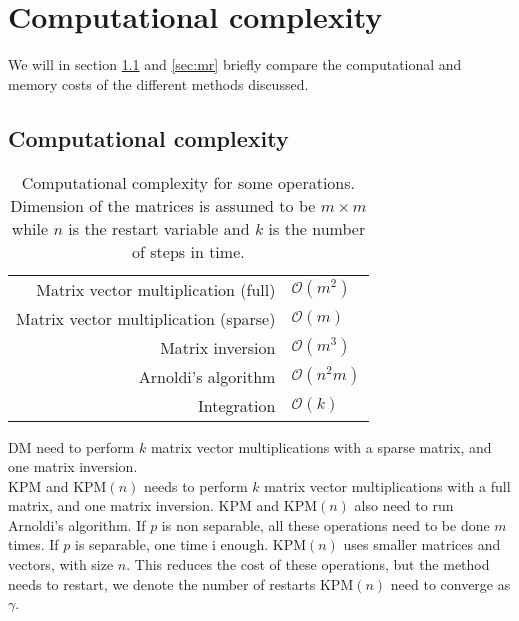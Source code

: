 \chapter{Computational complexity}%
\label{sec:comp}
We will in section \ref{sec:cc} and \ref{sec:mr} briefly compare the computational and memory costs of the different methods discussed.%
\section{Computational complexity} \label{sec:cc}
\begin{table}[H]
\centering
\begin{tabular}{r | l}
 Matrix vector multiplication (full) & $\mathcal{O}(m^2)$ \cite{complex} \\
 Matrix vector multiplication (sparse) & $\mathcal{O}(m)$ \cite{complex} \\
 Matrix inversion  & $ \mathcal{O}(m^3)$ \cite{complex} \\
 Arnoldi's algorithm & $ \mathcal{O}(n^2 m)$ \cite{saad} \\
 Integration & $\mathcal{O}(k)$
\end{tabular}
\caption{Computational complexity for some operations. Dimension of the matrices is assumed to be $m \times m$ while $n$ is the restart variable and $k$ is the number of steps in time.}
\label{tab:runtime}
\end{table}
DM need to perform $k$ matrix vector multiplications with a sparse matrix, and one matrix inversion. \\

KPM and KPM$(n)$ needs to perform $k$ matrix vector multiplications with a full matrix, and one matrix inversion. KPM and KPM$(n)$ also need to run Arnoldi's algorithm. If $p$ is non separable, all these operations need to be done $m$ times. If $p$ is separable, one time i enough. KPM$(n)$ uses smaller matrices and vectors, with size $n$. This reduces the cost of these operations, but the method needs to restart, we denote the number of restarts KPM$(n)$ need to converge as $\gamma$. \\

